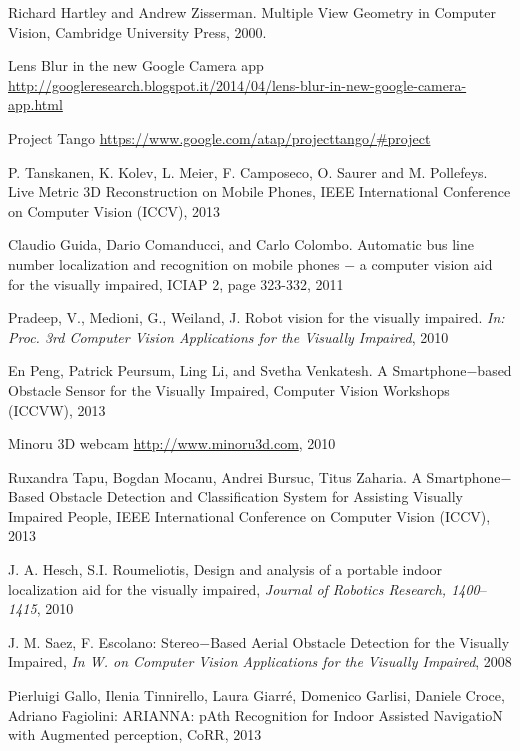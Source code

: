 
\begin{thebibliography}{99}

 Richard Hartley and Andrew Zisserman. Multiple View Geometry in Computer Vision, Cambridge University Press, 2000.

 Lens Blur in the new Google Camera app \newline
\url{http://googleresearch.blogspot.it/2014/04/lens-blur-in-new-google-camera-app.html}

 Project Tango \newline  \url{https://www.google.com/atap/projecttango/#project}

 P. Tanskanen, K. Kolev, L. Meier, F. Camposeco, O. Saurer and M. Pollefeys. Live Metric 3D Reconstruction on Mobile Phones, IEEE International Conference on Computer Vision (ICCV), 2013

 Claudio Guida, Dario Comanducci, and Carlo Colombo. Automatic bus line number localization and recognition on mobile phones $-$ a computer vision aid for the visually impaired, ICIAP 2, page 323-332, 2011

 Pradeep, V., Medioni, G., Weiland, J. Robot vision for the visually impaired. \textit{In: Proc. 3rd Computer Vision Applications for the Visually Impaired}, 2010

 En Peng, Patrick Peursum, Ling Li, and Svetha Venkatesh. A Smartphone$-$based Obstacle Sensor for the Visually Impaired, Computer Vision Workshops (ICCVW), 2013

 Minoru 3D webcam \newline
\url{http://www.minoru3d.com}, 2010

 Ruxandra Tapu, Bogdan Mocanu, Andrei Bursuc, Titus Zaharia. A Smartphone$-$Based Obstacle Detection and Classification System for Assisting Visually Impaired People, IEEE International Conference on Computer Vision (ICCV), 2013

  J. A. Hesch, S.I. Roumeliotis, Design and analysis of a portable indoor localization aid for the visually impaired, \textit{Journal of Robotics Research, 1400$–$1415}, 2010

 J. M. Saez, F. Escolano: Stereo$-$Based Aerial Obstacle Detection for the Visually Impaired, \textit{In W. on Computer Vision Applications for the Visually Impaired}, 2008 

 Pierluigi Gallo, Ilenia Tinnirello, Laura Giarré, Domenico Garlisi, Daniele Croce, Adriano Fagiolini: ARIANNA: pAth Recognition for Indoor Assisted NavigatioN with Augmented perception, CoRR, 2013


\end{thebibliography}
